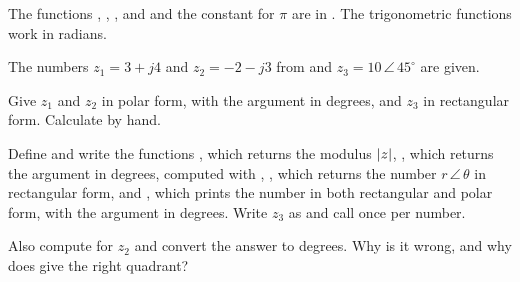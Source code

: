 The functions , , ,  and  and the
constant  for $\pi$ are in . The trigonometric functions work in radians.

The numbers $z_1 = 3 + j4$ and $z_2 = -2 - j3$ from  and
$z_3 = 10\,\angle\,45^{\circ}$ are given.
\begin{parts}
  \item Give $z_1$ and $z_2$ in polar form, with the argument in degrees, and $z_3$ in rectangular
    form. Calculate by hand.
  \item Define  and write the functions , which returns the modulus $\lvert z\rvert$, , which returns the argument in degrees, computed with ,
    , which returns the number
    $r\,\angle\,\theta$ in rectangular form, and ,
    which prints the number in both rectangular and polar form, with the argument in degrees. Write
    $z_3$ as  and call  once per number.
  \item Also compute  for $z_2$ and convert the answer to degrees. Why is
    it wrong, and why does  give the right quadrant?
\end{parts}
